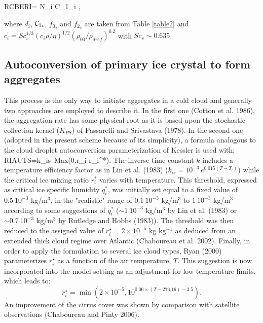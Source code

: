 \be\label{BER1}
RCBERI=\frac{\displaystyle{4\pi}}{\displaystyle{\rho}}
    N_i {{\cal C}_1}_i
    ,
\ee

\noindent where $d_i$, ${{\cal C}_1}_i$, ${{f}_0}_i$ and ${{f}_2}_i$ are taken
from Table \ref{table2} and
$c^\prime_i=Sc_{v}^{1/3}(c_i \rho/\eta)^{1/2}(\rho_{00}/\rho_{dref})^{0.2}$ with
$Sc_{v} \sim 0.635$.

%
\subsection{Autoconversion of primary ice crystal to form aggregates}
%
This process is the only way to initiate aggregates in a cold cloud and
generally two approaches are employed to describe it. In the first one
(Cotton et al. 1986), the aggregation rate has some physical root as it is
based upon the stochastic collection kernel ($K_{PS}$) of Passarelli and
Srivastava (1978). In the second one (adopted in the present scheme because of
its simplicity), a formula analogous to the cloud droplet autoconversion
parameterization of Kessler is used with:
%
\be\label{AU1}
RIAUTS=k_{is}\ Max(0,r_i-r_i^*).
\ee
%
\noindent The inverse time constant $k$ includes a temperature efficiency
factor as in Lin et al. (1983) ($k_{is}=10^{-3}\,e^{0.015(T-T_t)}$) while the
critical ice mixing ratio $r_i^*$ varies with temperature.
This threshold, expressed as critical ice specific humidity $q_i^*$,
was initially set equal to a fixed value of $0.5\ 10^{-3}$ kg/m$^3$, 
in the "realistic" range of $0.1\ 10^{-3}$ kg/m$^3$ to $1\ 10^{-3}$ kg/m$^3$
according to some suggestions of $q_i^*$ ($\sim 1\ 10^{-3}$ kg/m$^3$ by Lin
et al. (1983) or $\sim 0.7\ 10^{-3}$ kg/m$^3$ by Rutledge and Hobbs (1983)).
The threshold was then reduced to the assigned value of  
$r_i^\star = 2 \times 10^{-5}$ kg kg$^{-1}$ as deduced from an extended thick
cloud regime over Atlantic (Chaboureau et al. 2002).
Finally, in order to apply the formulation to several ice cloud types,
Ryan (2000) parameterizes $r_i^\star$ as a function of the air temperature, $T$.
This suggestion is now incorporated into the model setting as an adjustment
for low temperature limits, which leads to:
\begin{equation}r_i^\star= \min (2 \times 10^{-5}, 10^{0.06\times(T-273.16 )-3.5} ).
\label{NEWT}\end{equation}
An improvement of the cirrus cover was shown by comparison with satellite observations
(Chaboureau and Pinty 2006).
%
